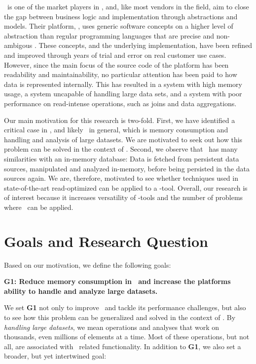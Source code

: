 \genus~is one of the market players in \mde, and, like most vendors in the field, aim to close the gap between business logic and implementation through abstractions and models. Their platform, \gap, uses generic software concepts on a higher level of abstraction than regular programming languages that are precise and non-ambigous \cite{noauthor_undated-qy}. These concepts, and the underlying implementation, have been refined and improved through years of trial and error on real customer use cases. However, since the main focus of the source code of the platform has been readability and maintainability, no particular attention has been paid to how data is represented internally. This has resulted in a system with high memory usage, a system uncapable of handling large data sets, and a system with poor performance on read-intense operations, such as joins and data aggregations.

Our main motivation for this research is two-fold. First, we have identified a critical case in \gap, and likely \mde~in general, which is memory consumption and handling and analysis of large datasets. We are motivated to seek out how this problem can be solved in the context of \mdd. Second, we observe that \gap~has many similarities with an in-memory database: Data is fetched from persistent data sources, manipulated and analyzed in-memory, before being persisted in the data sources again. We are, therefore, motivated to see whether techniques used in state-of-the-art read-optimized can be applied to a \mde-tool. Overall, our research is of interest because it increases versatility of \mdd-tools and the number of problems where \mde~can be applied.

\section{Goals and Research Question}
\label{sec:Goals and Research Question}
Based on our motivation, we define the following goals:

\setlength{\leftskip}{1cm}

\textbf{G1: Reduce memory consumption in \gap~and increase the platforms ability to handle and analyze large datasets.}

\setlength{\leftskip}{0pt}

We set \textbf{G1} not only to improve \gap~and tackle its performance challenges, but also to see how this problem can be generalized and solved in the context of \mde. By \textit{handling large datasets}, we mean operations and analyses that work on thousands, even millions of elements at a time. Most of these operations, but not all, are associated with \bi~related functionality. In addition to \textbf{G1}, we also set a broader, but yet intertwined goal:


